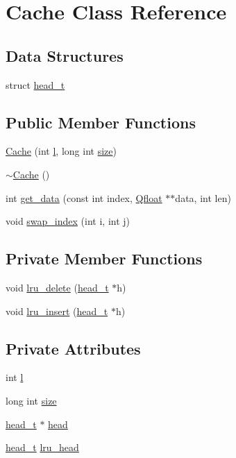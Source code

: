 \hypertarget{classCache}{}\section{Cache Class Reference}
\label{classCache}
\subsection*{Data Structures}
\begin{DoxyCompactItemize}
\item 
struct \hyperlink{structCache_1_1head__t}{head\+\_\+t}
\end{DoxyCompactItemize}
\subsection*{Public Member Functions}
\begin{DoxyCompactItemize}
\item 
\hyperlink{classCache_a2823f543d4f9b92c29472b904961afe1}{Cache} (int \hyperlink{classCache_a8f5881aa763cb4af5cfb7b6bda0cff35}{l}, long int \hyperlink{classCache_af50a89d0734a160cf812384df64599f9}{size})
\item 
\hyperlink{classCache_af8b171a6c49d88d3ba179477484b9d48}{$\sim$\+Cache} ()
\item 
int \hyperlink{classCache_aca49263fb34641e208884cc223b25317}{get\+\_\+data} (const int index, \hyperlink{svm__core_8cpp_a8755d90a54ecfb8d15051af3e0542592}{Qfloat} $\ast$$\ast$data, int len)
\item 
void \hyperlink{classCache_aaff2dc955f9492c044c98a5f09cfddcc}{swap\+\_\+index} (int i, int j)
\end{DoxyCompactItemize}
\subsection*{Private Member Functions}
\begin{DoxyCompactItemize}
\item 
void \hyperlink{classCache_ab83abc6ded621fa2575e3a44421e0cb4}{lru\+\_\+delete} (\hyperlink{structCache_1_1head__t}{head\+\_\+t} $\ast$h)
\item 
void \hyperlink{classCache_a51e5ffc28e2ec6662ae13ab78ccc2243}{lru\+\_\+insert} (\hyperlink{structCache_1_1head__t}{head\+\_\+t} $\ast$h)
\end{DoxyCompactItemize}
\subsection*{Private Attributes}
\begin{DoxyCompactItemize}
\item 
int \hyperlink{classCache_a8f5881aa763cb4af5cfb7b6bda0cff35}{l}
\item 
long int \hyperlink{classCache_af50a89d0734a160cf812384df64599f9}{size}
\item 
\hyperlink{structCache_1_1head__t}{head\+\_\+t} $\ast$ \hyperlink{classCache_aaf3674e8de1e3896dba64b4caac79f0a}{head}
\item 
\hyperlink{structCache_1_1head__t}{head\+\_\+t} \hyperlink{classCache_a91fc6bd9c69ed37e8e0499da8d47794e}{lru\+\_\+head}
\end{DoxyCompactItemize}


